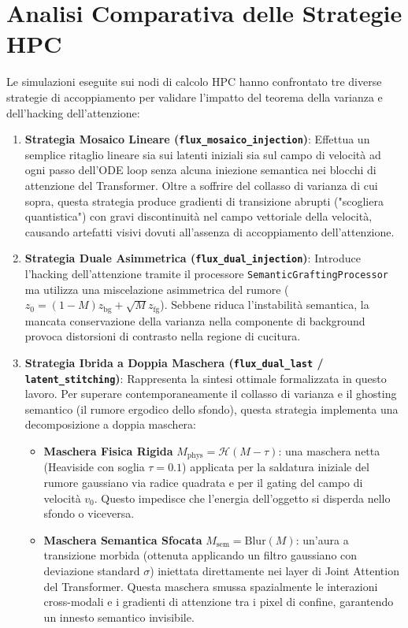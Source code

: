 \documentclass[12pt,a4paper]{report}
\begin{document}
\section{Analisi Comparativa delle Strategie HPC}
Le simulazioni eseguite sui nodi di calcolo HPC hanno confrontato tre diverse strategie di accoppiamento per validare l'impatto del teorema della varianza e dell'hacking dell'attenzione:
\begin{enumerate}
    \item \textbf{Strategia Mosaico Lineare (\texttt{flux\_mosaico\_injection})}:
    Effettua un semplice ritaglio lineare sia sui latenti iniziali sia sul campo di velocità ad ogni passo dell'ODE loop senza alcuna iniezione semantica nei blocchi di attenzione del Transformer. Oltre a soffrire del collasso di varianza di cui sopra, questa strategia produce gradienti di transizione abrupti ("scogliera quantistica") con gravi discontinuità nel campo vettoriale della velocità, causando artefatti visivi dovuti all'assenza di accoppiamento dell'attenzione.
    
    \item \textbf{Strategia Duale Asimmetrica (\texttt{flux\_dual\_injection})}:
    Introduce l'hacking dell'attenzione tramite il processore \texttt{SemanticGraftingProcessor} ma utilizza una miscelazione asimmetrica del rumore ($z_0 = (1-M) z_{\text{bg}} + \sqrt{M} z_{\text{fg}}$). Sebbene riduca l'instabilità semantica, la mancata conservazione della varianza nella componente di background provoca distorsioni di contrasto nella regione di cucitura.
    
    \item \textbf{Strategia Ibrida a Doppia Maschera (\texttt{flux\_dual\_last} / \texttt{latent\_stitching})}:
    Rappresenta la sintesi ottimale formalizzata in questo lavoro. Per superare contemporaneamente il collasso di varianza e il ghosting semantico (il rumore ergodico dello sfondo), questa strategia implementa una decomposizione a doppia maschera:
    \begin{itemize}
        \item \textbf{Maschera Fisica Rigida} $M_{\text{phys}} = \mathcal{H}(M - \tau)$: una maschera netta (Heaviside con soglia $\tau = 0.1$) applicata per la saldatura iniziale del rumore gaussiano via radice quadrata e per il gating del campo di velocità $v_0$. Questo impedisce che l'energia dell'oggetto si disperda nello sfondo o viceversa.
        \item \textbf{Maschera Semantica Sfocata} $M_{\text{sem}} = \text{Blur}(M)$: un'aura a transizione morbida (ottenuta applicando un filtro gaussiano con deviazione standard $\sigma$) iniettata direttamente nei layer di Joint Attention del Transformer. Questa maschera smussa spazialmente le interazioni cross-modali e i gradienti di attenzione tra i pixel di confine, garantendo un innesto semantico invisibile.
    \end{itemize}
\end{enumerate}
\end{document}
